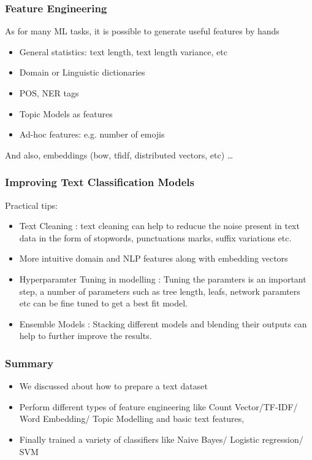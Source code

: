 \begin{frame}[fragile]
  \frametitle{Feature Engineering}
  
  As for many ML tasks, it is possible to generate useful features by hands
  
\begin{itemize}
\item General statistics: text length, text length variance, etc
\item Domain or Linguistic dictionaries
\item POS, NER tags
\item Topic Models as features
\item Ad-hoc features: e.g. number of emojis
\end{itemize}

And also, embeddings (bow, tfidf, distributed vectors, etc) \ldots
\end{frame} 

\begin{frame}[fragile]
  \frametitle{Improving Text Classification Models}
  
Practical tips:
  
\begin{itemize}
\item Text Cleaning : text cleaning can help to reducue the noise present in text data in the form of stopwords, punctuations marks, suffix variations etc.
\item More intuitive domain and NLP features along with embedding vectors
\item Hyperparamter Tuning in modelling : Tuning the paramters is an important step, a number of parameters such as tree length, leafs, network paramters etc can be fine tuned to get a best fit model.
\item Ensemble Models : Stacking different models and blending their outputs can help to further improve the results.
\end{itemize}
\end{frame} 

\begin{frame}[fragile]
  \frametitle{Summary}
\begin{itemize}
\item We discussed about how to prepare a text dataset 
\item Perform different types of feature engineering like Count Vector/TF-IDF/ Word Embedding/ Topic Modelling and basic text features, 
\item Finally trained a variety of classifiers like Naive Bayes/ Logistic regression/ SVM
\end{itemize}

\end{frame} 


